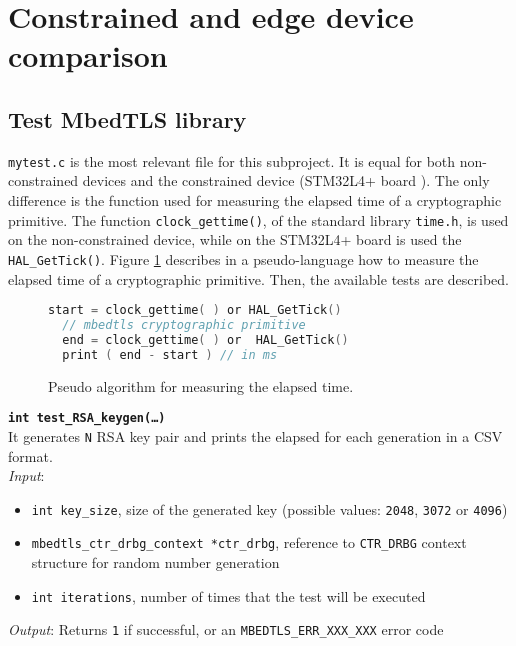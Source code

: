 
\section{Constrained and edge device comparison}
\subsection{Test MbedTLS library}
\texttt{mytest.c} is the most relevant file for this subproject. It is equal for both non-constrained devices and the constrained device (STM32L4+ board \cite{stm32-board-product}). The only difference is the function used for measuring the elapsed time of a cryptographic primitive. The function \texttt{clock\_gettime()}, of the standard library \texttt{time.h}, is used on the non-constrained device, while on the STM32L4+ board is used the \texttt{HAL\_GetTick()}. Figure \ref{pseudo-algo} describes in a pseudo-language how to measure the elapsed time of a cryptographic primitive. 
Then, the available tests are described. \\
\begin{figure}[H]
\begin{lstlisting}[language=C,frame=single]
  start = clock_gettime( ) or HAL_GetTick()
  // mbedtls cryptographic primitive
  end = clock_gettime( ) or  HAL_GetTick()
  print ( end - start ) // in ms
\end{lstlisting}
\caption{Pseudo algorithm for measuring the elapsed time. \label{pseudo-algo}}
\end{figure}

\noindent
\texttt{\bfseries int test\_RSA\_keygen(\dots)}\\
It generates \texttt{N} RSA key pair and prints the elapsed for each generation in a CSV format. \\
\textit{Input}:
\begin{itemize}[noitemsep,nolistsep]
  \item \texttt{int key\_size}, size of the generated key (possible values: \texttt{2048}, \texttt{3072} or \texttt{4096})
  \item \texttt{mbedtls\_ctr\_drbg\_context *ctr\_drbg}, reference to \texttt{CTR\_DRBG} context structure for random number generation
  \item \texttt{int iterations}, number of times that the test will be executed
\end{itemize}
\textit{Output}: Returns \texttt{1} if successful, or an \texttt{MBEDTLS\_ERR\_XXX\_XXX} error code \\


